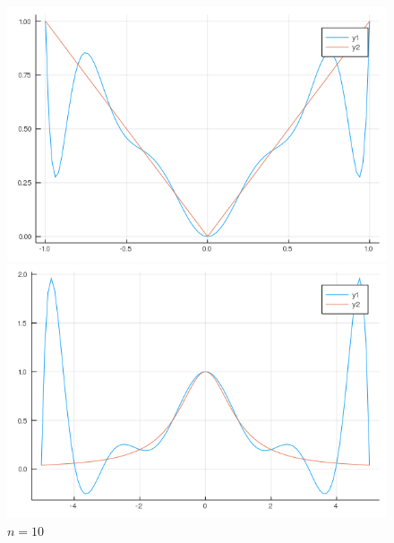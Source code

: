 \documentclass[11pt, a4paper]{article}
\begin{document}
\begin{figure}[H]
        \begin{minipage}{0.5\textwidth}
            \caption{$n=10$}
            \centering
            \includegraphics[width=\linewidth]{plot-6_a_n10}
        \end{minipage}
        \begin{minipage}{0.5\textwidth}
            \caption{$n=10$}
            \centering
            \includegraphics[width=\linewidth]{plot-6_b_n10}
        \end{minipage}
        

\end{figure}
\end{document}
